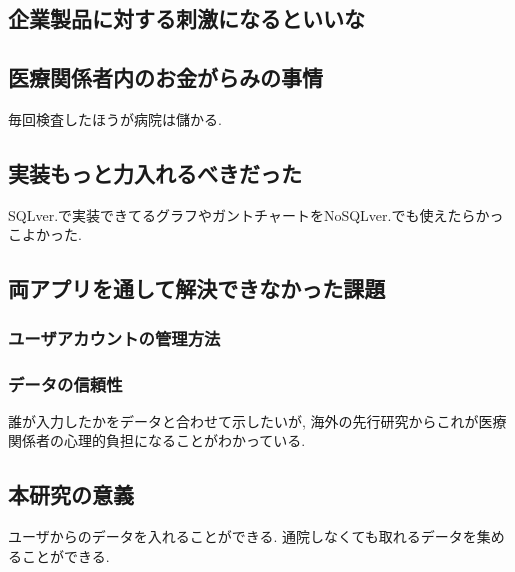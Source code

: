 \subsection{企業製品に対する刺激になるといいな}

\subsection{医療関係者内のお金がらみの事情}
  毎回検査したほうが病院は儲かる.

\subsection{実装もっと力入れるべきだった}
    SQLver.で実装できてるグラフやガントチャートをNoSQLver.でも使えたらかっこよかった.

\subsection{両アプリを通して解決できなかった課題}
\subsubsection{ユーザアカウントの管理方法}
\subsubsection{データの信頼性}
   誰が入力したかをデータと合わせて示したいが,
   海外の先行研究からこれが医療関係者の心理的負担になることがわかっている.

\subsection{本研究の意義}
  ユーザからのデータを入れることができる.
  通院しなくても取れるデータを集めることができる.
